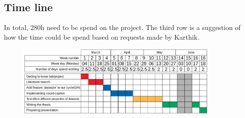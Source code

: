 \documentclass[10pt]{article}
\begin{document}
		
	
	\subsection*{Time line}
	
		In total, 280h need to be spend on the project. The third row is a suggestion of how the time could be spend based on requests made by Karthik.
		\begin{figure}[h!]
			\centering
			\includegraphics[width=0.9\textwidth]{190303_schedule.png}
		\end{figure}
\end{document}
